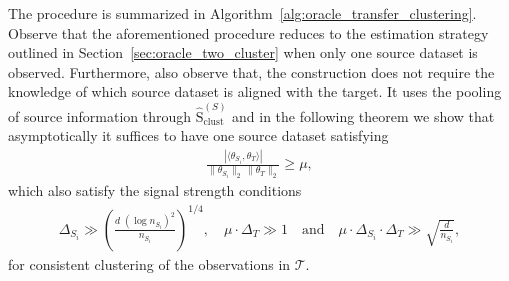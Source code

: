 \documentclass[10pt]{article}
\newcommand{\wh}{\widehat}
\newcommand{\calT}{\mathcal T}
\newcommand{\trg}{T}
\newcommand{\thetaT}{\theta_{\trg}}
\newcommand{\DeltaT}{\Delta_{\trg}}
\newcommand{\src}{S}
\newcommand{\nSm}[1]{n_{\src_{#1}}}
\newcommand{\thetamS}[1]{\theta_{\src_{#1}}}
\newcommand{\DeltaSm}[1]{\Delta_{\src_{#1}}}
\newcommand{\spclust}{\wh{\mathrm{S}}_{\mathrm{clust}}}
\begin{document}
The procedure is summarized in Algorithm~\ref{alg:oracle_transfer_clustering}. Observe that the aforementioned procedure reduces to the estimation strategy outlined in Section~\ref{sec:oracle_two_cluster} when only one source dataset is observed. Furthermore, also observe that, the construction does not require the knowledge of which source dataset is aligned with the target. It uses the pooling of source information through $\spclust^{(\src)}$ and in the following theorem we show that asymptotically it suffices to have one source dataset satisfying 
\begin{align}
\label{eq:correct_choose_alignment}
    \frac{|\langle \thetamS{i},\thetaT\rangle|}{\|\thetamS{i}\|_2\,\|\thetaT\|_2} \ge \mu,
\end{align}
which also satisfy the signal strength conditions
\begin{align}
\label{eq:necessary_condition_mult_source}
\DeltaSm{i} \gg \left(\frac{d\;(\log \nSm{i})^2}{\nSm{i}}\right)^{1/4},\quad\mu\cdot\DeltaT \gg 1\quad\text{and}\quad\mu\cdot\DeltaSm{i}\cdot\DeltaT \gg \sqrt{\frac{d}{\nSm{i}}},
\end{align}
for consistent clustering of the observations in $\calT$.
\end{document}
